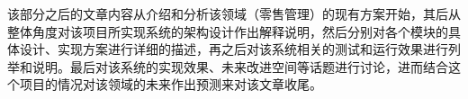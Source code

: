 该部分之后的文章内容从介绍和分析该领域（零售管理）的现有方案开始，其后从整体角度对该项目所实现系统的架构设计作出解释说明，然后分别对各个模块的具体设计、实现方案进行详细的描述，再之后对该系统相关的测试和运行效果进行列举和说明。最后对该系统的实现效果、未来改进空间等话题进行讨论，进而结合这个项目的情况对该领域的未来作出预测来对该文章收尾。

